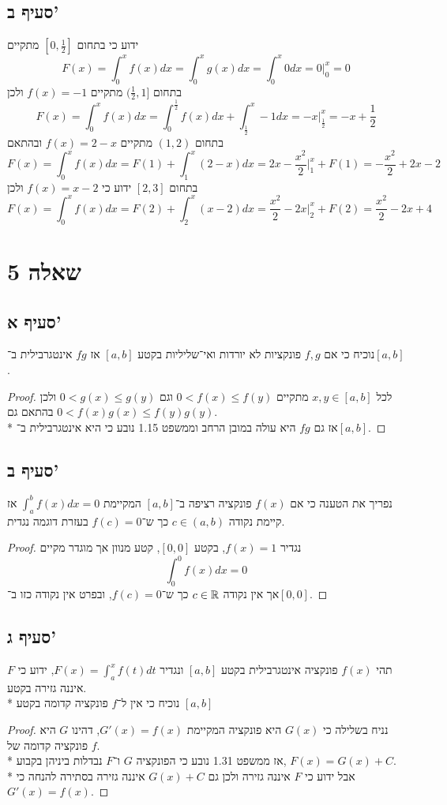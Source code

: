 \subsection{סעיף ב'}
ידוע כי בתחום $[0, \frac{1}{2}]$ מתקיים
\[
	F(x) = \int_0^x f(x) dx = \int_0^x g(x) dx = \int_0^x 0dx = 0 \Big|_0^x = 0
\]
בתחום $(\frac{1}{2}, 1]$ מתקיים $f(x) = -1$ ולכן %
\[
	F(x) = \int_0^x f(x) dx = \int_0^\frac{1}{2} f(x) dx + \int_\frac{1}{2}^x -1 dx = -x \Big|_\frac{1}{2}^x = -x + \frac{1}{2}
\]
בתחום $(1, 2)$ מתקיים $f(x) = 2 - x$ ובהתאם
\[
	F(x) = \int_0^x f(x) dx = F(1) + \int_1^x (2 - x) dx = 2x - \frac{x^2}{2} \Big|_1^x + F(1) = - \frac{x^2}{2} + 2x - 2
\]
בתחום $[2, 3]$ ידוע כי $f(x) = x - 2$ ולכן
\[
	F(x) = \int_0^x f(x) dx = F(2) + \int_2^x (x - 2) dx = \frac{x^2}{2} - 2x \Big|_2^x + F(2) = \frac{x^2}{2} - 2x + 4
\]

\section{שאלה 5}
\subsection{סעיף א'}
נוכיח כי אם $f, g$ פונקציות לא יורדות ואי־שליליות בקטע $[a, b]$ אז $fg$ אינטגרבילית ב־$[a, b]$.
\begin{proof}
	לכל $x, y \in [a, b]$ מתקיים $0 < f(x) \le f(y)$ וגם $0 < g(x) \le g(y)$ ולכן בהתאם גם $0 < f(x) g(x) \le f(y) g(y)$. \\*
	אז גם $fg$ היא עולה במובן הרחב וממשפט 1.15 נובע כי היא אינטגרבילית ב־$[a, b]$.
\end{proof}

\subsection{סעיף ב'}
נפריך את הטענה כי אם $f(x)$ פונקציה רציפה ב־$[a, b]$ המקיימת $\int_a^b f(x) dx = 0$ אז קיימת נקודה $c \in (a, b)$ כך ש־$f(c) = 0$ בעזרת דוגמה נגדית.
\begin{proof}
	נגדיר $f(x) = 1$, בקטע $[0, 0]$, קטע מנוון אך מוגדר מקיים
	\[
		\int_0^0 f(x) dx = 0
	\]
	אך אין נקודה $c \in \mathbb{R}$ כך ש־$f(c) = 0$, ובפרט אין נקודה כזו ב־$[0, 0]$.
\end{proof}

\subsection{סעיף ג'}
תהי $f(x)$ פונקציה אינטגרבילית בקטע $[a, b]$ ונגדיר $F(x) = \int_a^x f(t) dt$, ידוע כי $F$ איננה גזירה בקטע. \\*
נוכיח כי אין ל־$f$ פונקציה קדומה בקטע $[a, b]$
\begin{proof}
	נניח בשלילה כי $G(x)$ היא פונקציה המקיימת $G'(x) = f(x)$, דהינו $G$ היא פונקציה קדומה של $f$. \\*
	אז ממשפט 1.31 נובע כי הפונקציה $G$ ו־$F$ נבדלות ביניהן בקבוע, $F(x) = G(x) + C$. \\*
	אבל ידוע כי $F$ איננה גזירה ולכן גם $G(x) + C$ איננה גזירה בסתירה להנחה כי $G'(x) = f(x)$.
\end{proof}

